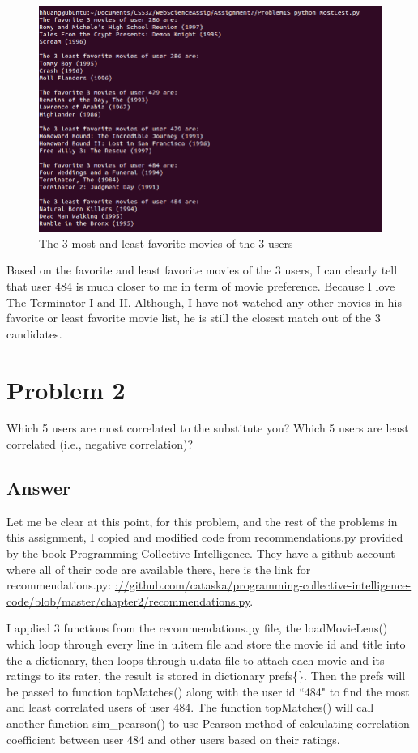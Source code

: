 \documentclass[12pt]{article}
\begin{document}
\begin{figure}[h]
\centering
\includegraphics[width=6.5in]{mostleast.png}
\caption{The 3 most and least favorite movies of the 3 users}
\end{figure}

Based on the favorite and least favorite movies of the 3 users, I can clearly tell that user 484 is much closer to me in term of movie preference. Because I love The Terminator I and II. Although, I have not watched any other movies in his favorite or least favorite movie list, he is still the closest match out of the 3 candidates.
\newpage

\section*{Problem 2}

Which 5 users are most correlated to the substitute you? Which
5 users are least correlated (i.e., negative correlation)?

\subsection*{Answer}

Let me be clear at this point, for this problem, and the rest of the problems in this assignment, I copied and modified code from recommendations.py provided by the book Programming Collective Intelligence. They have a github account where all of their code are available there, here is the link for recommendations.py: \url{://github.com/cataska/programming-collective-intelligence-code/blob/master/chapter2/recommendations.py}. 

I applied 3 functions from the recommendations.py file, the loadMovieLens() which loop through every line in u.item file and store the movie id and title into the a dictionary, then loops through u.data file to attach each movie and its ratings to its rater, the result is stored in dictionary prefs\{\}. Then the prefs will be passed to function topMatches() along with the user id ``484" to find the most and least correlated users of user 484. The function topMatches() will call another function sim\_pearson() to use Pearson method of calculating correlation coefficient between user 484 and other users based on their ratings. 
\end{document}
